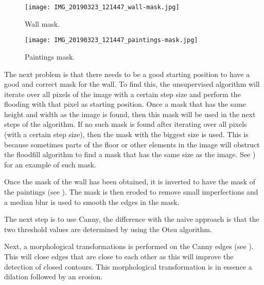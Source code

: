
\begin{figure}[h]
    \centering
    \begin{minipage}[b]{0.45\textwidth}
        \texttt{[image: IMG\_20190323\_121447\_wall-mask.jpg]}
        \caption{Wall mask.}
        \label{fig:paiting_detection_wall-mask}
    \end{minipage}
    \hfill
    \begin{minipage}[b]{0.45\textwidth}
        \texttt{[image: IMG\_20190323\_121447\_paintings-mask.jpg]}
        \caption{Paintings mask.}
        \label{fig:paiting_detection_paintings-mask}
    \end{minipage}
\end{figure}

The next problem is that there needs to be a good starting position to have a good and correct mask for the wall. To find this, the unsupervised algorithm will iterate over all pixels of the image with a certain step size and perform the flooding with that pixel as starting position. Once a mask that has the same height and width as the image is found, then this mask will be used in the next steps of the algorithm. If no such mask is found after iterating over all pixels (with a certain step size), then the mask with the biggest size is used. This is because sometimes parts of the floor or other elements in the image will obstruct the floodfill algorithm to find a mask that has the same size as the image. See ) for an example of such mask.

Once the mask of the wall has been obtained, it is inverted to have the mask of the paintings (see ). The mask is then eroded to remove small imperfections and a median blur is used to smooth the edges in the mask.

The next step is to use Canny, the difference with the naive approach is that the two threshold values are determined by using the Otsu algorithm.

Next, a morphological transformations is performed on the Canny edges (see ). This will close edges that are close to each other as this will improve the detection of closed contours. This morphological transformation is in essence a dilation followed by an erosion.

